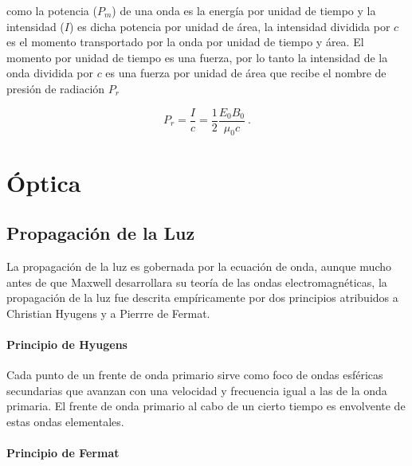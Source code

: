 \documentclass{tufte-handout}
\begin{document}
como la potencia ($P_m$) de una onda es la energía por unidad de tiempo y la intensidad ($I$) es dicha potencia por unidad de área, la intensidad dividida por $c$ es el momento transportado por la onda por unidad de tiempo y área. El momento por unidad de tiempo es una fuerza, por lo tanto la intensidad de la onda dividida por $c$ es una fuerza por unidad de área que recibe el nombre de presión de radiación $P_r$


\begin{equation}
P_r = \displaystyle\frac{I}{c} = \displaystyle\frac{1}{2}\displaystyle\frac{E_0B_0}{\mu_0 c}~.
\end{equation}

\clearpage

\section{Óptica}

\subsection{Propagación de la Luz}

La propagación de la luz es gobernada por la ecuación de onda, aunque mucho antes de que Maxwell desarrollara su teoría de las ondas electromagnéticas, la propagación de la luz fue descrita empíricamente por dos principios atribuidos a Christian Hyugens y a Pierrre de Fermat.

\paragraph{Principio de Hyugens}

Cada punto de un frente de onda primario sirve como foco de ondas esféricas secundarias que avanzan con una velocidad y frecuencia igual a las de la onda primaria. El frente de onda primario al cabo de un cierto tiempo es envolvente de estas ondas elementales.

\paragraph{Principio de Fermat}
\end{document}
